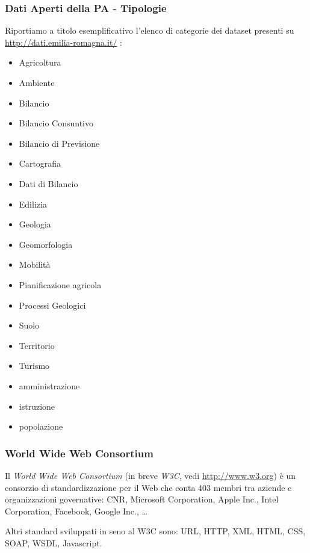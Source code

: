 \documentclass[8pt]{beamer}
\begin{document}
\begin{frame}
	\frametitle{Dati Aperti della PA - Tipologie}
	Riportiamo a titolo esemplificativo l'elenco di categorie dei dataset presenti
	su \url{http://dati.emilia-romagna.it/} : 
	\begin{itemize}
	  \item Agricoltura
	  \item Ambiente
	  \item Bilancio
	  \item Bilancio Consuntivo
	  \item Bilancio di Previsione
	  \item Cartografia
	  \item Dati di Bilancio
	  \item Edilizia
	  \item Geologia
	  \item Geomorfologia
	  \item Mobilit\`a 
	  \item Pianificazione agricola
	  \item Processi Geologici 
	  \item Suolo 
	  \item Territorio
	  \item Turismo  
	  \item amministrazione  
	  \item istruzione 
	  \item popolazione
	\end{itemize}
\end{frame}
\begin{frame}
\frametitle{World Wide Web Consortium}
Il \emph{World Wide Web Consortium} (in breve \emph{W3C}, vedi \url{http://www.w3.org}) 
\`e un consorzio di standardizzazione per il Web che
conta 403 membri tra aziende e organizzazioni governative: CNR,
Microsoft Corporation, Apple Inc., Intel Corporation, Facebook, Google Inc., \ldots
\vspace{\baselineskip}

Altri standard sviluppati in seno al W3C sono: URL, HTTP, XML, HTML, CSS, SOAP, 
WSDL, Javascript. 
\end{frame}
\end{document}
